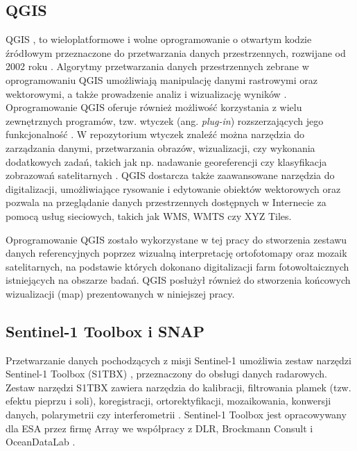 \documentclass{amuthesis}
\begin{document}
\hypertarget{qgis}{%
\subsection{QGIS}\label{qgis}}

QGIS \autocite{qgis}, to wieloplatformowe i wolne oprogramowanie o
otwartym kodzie źródłowym przeznaczone do przetwarzania danych
przestrzennych, rozwijane od 2002 roku
\autocite{hejmanowska_2020_dane,flenniken_2020_qgis}. Algorytmy
przetwarzania danych przestrzennych zebrane w oprogramowaniu QGIS
umożliwiają manipulację danymi rastrowymi oraz wektorowymi, a także
prowadzenie analiz i wizualizację wyników
\autocite{hejmanowska_2020_dane}. Oprogramowanie QGIS oferuje również
możliwość korzystania z wielu zewnętrznych programów, tzw. wtyczek (ang.
\emph{plug-in}) rozszerzających jego funkcjonalność
\autocite{hejmanowska_2020_dane}. W repozytorium wtyczek znaleźć można
narzędzia do zarządzania danymi, przetwarzania obrazów, wizualizacji,
czy wykonania dodatkowych zadań, takich jak np. nadawanie georeferencji
czy klasyfikacja zobrazowań satelitarnych
\autocite{hejmanowska_2020_dane}. QGIS dostarcza także zaawansowane
narzędzia do digitalizacji, umożliwiające rysowanie i edytowanie
obiektów wektorowych oraz pozwala na przeglądanie danych przestrzennych
dostępnych w Internecie za pomocą usług sieciowych, takich jak WMS, WMTS
czy XYZ Tiles.

Oprogramowanie QGIS zostało wykorzystane w tej pracy do stworzenia
zestawu danych referencyjnych poprzez wizualną interpretację
ortofotomapy oraz mozaik satelitarnych, na podstawie których dokonano
digitalizacji farm fotowoltaicznych istniejących na obszarze badań. QGIS
posłużył również do stworzenia końcowych wizualizacji (map)
prezentowanych w niniejszej pracy.

\hypertarget{sentinel-1-toolbox-i-snap}{%
\subsection{Sentinel-1 Toolbox i SNAP}\label{sentinel-1-toolbox-i-snap}}

Przetwarzanie danych pochodzących z misji Sentinel-1 umożliwia zestaw
narzędzi Sentinel-1 Toolbox (S1TBX) \autocite{s1tbx}, przeznaczony do
obsługi danych radarowych. Zestaw narzędzi S1TBX zawiera narzędzia do
kalibracji, filtrowania plamek (tzw. efektu pieprzu i soli),
koregistracji, ortorektyfikacji, mozaikowania, konwersji danych,
polarymetrii czy interferometrii \autocite{sentinel-1-toolbox}.
Sentinel-1 Toolbox jest opracowywany dla ESA przez firmę Array we
współpracy z DLR, Brockmann Consult i OceanDataLab
\autocite{sentinel-1-toolbox}.
\end{document}
